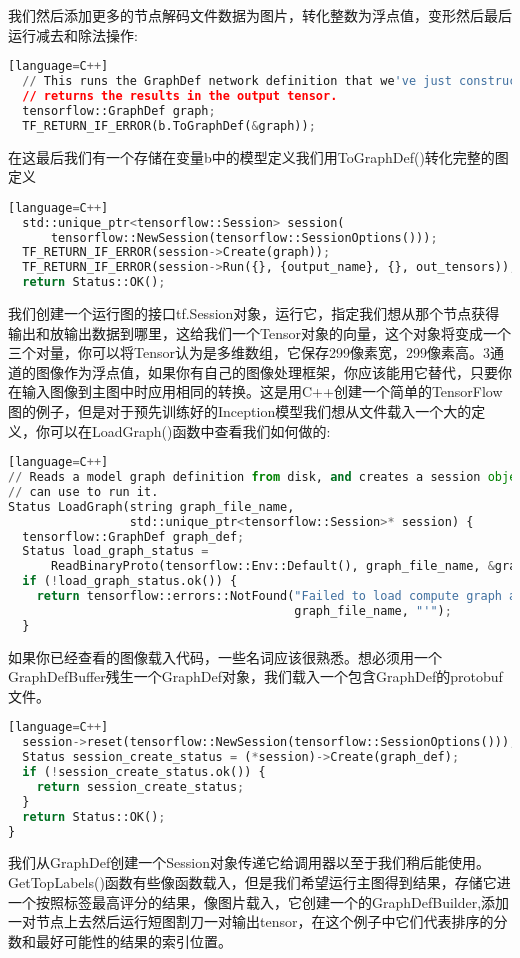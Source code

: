 我们然后添加更多的节点解码文件数据为图片，转化整数为浮点值，变形然后最后运行减去和除法操作:
\begin{lstlisting}[language=Python][language=C++]
  // This runs the GraphDef network definition that we've just constructed, and
  // returns the results in the output tensor.
  tensorflow::GraphDef graph;
  TF_RETURN_IF_ERROR(b.ToGraphDef(&graph));
\end{lstlisting}
在这最后我们有一个存储在变量b中的模型定义我们用ToGraphDef()转化完整的图定义
\begin{lstlisting}[language=Python][language=C++]
  std::unique_ptr<tensorflow::Session> session(
      tensorflow::NewSession(tensorflow::SessionOptions()));
  TF_RETURN_IF_ERROR(session->Create(graph));
  TF_RETURN_IF_ERROR(session->Run({}, {output_name}, {}, out_tensors));
  return Status::OK();
\end{lstlisting}
我们创建一个运行图的接口tf.Session对象，运行它，指定我们想从那个节点获得输出和放输出数据到哪里，这给我们一个Tensor对象的向量，这个对象将变成一个三个对量，你可以将Tensor认为是多维数组，它保存299像素宽，299像素高。3通道的图像作为浮点值，如果你有自己的图像处理框架，你应该能用它替代，只要你在输入图像到主图中时应用相同的转换。这是用C++创建一个简单的TensorFlow图的例子，但是对于预先训练好的Inception模型我们想从文件载入一个大的定义，你可以在LoadGraph()函数中查看我们如何做的:
\begin{lstlisting}[language=Python][language=C++]
// Reads a model graph definition from disk, and creates a session object you
// can use to run it.
Status LoadGraph(string graph_file_name,
                 std::unique_ptr<tensorflow::Session>* session) {
  tensorflow::GraphDef graph_def;
  Status load_graph_status =
      ReadBinaryProto(tensorflow::Env::Default(), graph_file_name, &graph_def);
  if (!load_graph_status.ok()) {
    return tensorflow::errors::NotFound("Failed to load compute graph at '",
                                        graph_file_name, "'");
  }
\end{lstlisting}
如果你已经查看的图像载入代码，一些名词应该很熟悉。想必须用一个GraphDefBuffer残生一个GraphDef对象，我们载入一个包含GraphDef的protobuf文件。
\begin{lstlisting}[language=Python][language=C++]
  session->reset(tensorflow::NewSession(tensorflow::SessionOptions()));
  Status session_create_status = (*session)->Create(graph_def);
  if (!session_create_status.ok()) {
    return session_create_status;
  }
  return Status::OK();
}
\end{lstlisting}
我们从GraphDef创建一个Session对象传递它给调用器以至于我们稍后能使用。GetTopLabels()函数有些像函数载入，但是我们希望运行主图得到结果，存储它进一个按照标签最高评分的结果，像图片载入，它创建一个的GraphDefBuilder,添加一对节点上去然后运行短图割刀一对输出tensor，在这个例子中它们代表排序的分数和最好可能性的结果的索引位置。
